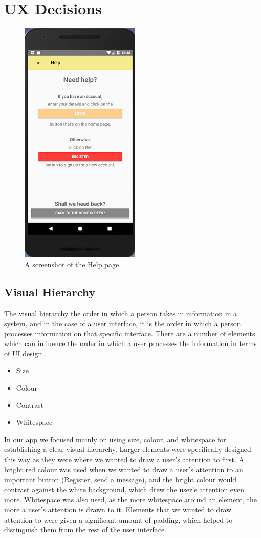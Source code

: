\documentclass[a4paper, 11pt]{article}
\begin{document}
\section{UX Decisions} 
\begin{figure}
\centering
\includegraphics{hierarchy.png}
\caption{A screenshot of the Help page}
\end{figure}
\subsection{Visual Hierarchy}

The visual hierarchy the order in which a person takes in information in a system, and in the case of a user interface, it is the order in which a person processes information on that specific interface. There are a number of elements which can influence the order in which a user processes the information in terms of UI design \cite{hierarchy}.

\begin{itemize}
	\item{Size}
	\item{Colour}
	\item{Contrast}
	\item{Whitespace}
\end{itemize}


In our app we focused mainly on using size, colour, and whitespace for establishing a clear visual hierarchy. Larger elements were specifically designed this way as they were where we wanted to draw a user's attention to first. A bright red colour was used when we wanted to draw a user's attention to an important button (Register, send a message), and the bright colour would contrast against the white background, which drew the user's attention even more. Whitespace was also used, as the more whitespace around an element, the more a user's attention is drawn to it. Elements that we wanted to draw attention to were given a significant amount of padding, which helped to distinguish them from the rest of the user interface.
\end{document}
